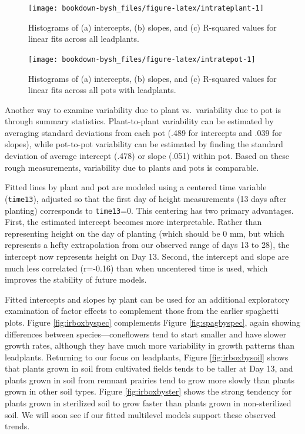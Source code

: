 \documentclass[
]{krantz}
\begin{document}
\begin{figure}

{\centering \texttt{[image: bookdown-bysh\_files/figure-latex/intrateplant-1]} 

}

\caption{ Histograms of (a) intercepts, (b) slopes, and (c) R-squared values for linear fits across all leadplants.}\label{fig:intrateplant}
\end{figure}

\begin{figure}

{\centering \texttt{[image: bookdown-bysh\_files/figure-latex/intratepot-1]} 

}

\caption{Histograms of (a) intercepts, (b) slopes, and (c) R-squared values for linear fits across all pots with leadplants.}\label{fig:intratepot}
\end{figure}

Another way to examine variability due to plant vs.~variability due to pot is through summary statistics. Plant-to-plant variability can be estimated by averaging standard deviations from each pot (.489 for intercepts and .039 for slopes), while pot-to-pot variability can be estimated by finding the standard deviation of average intercept (.478) or slope (.051) within pot. Based on these rough measurements, variability due to plants and pots is comparable.

Fitted lines by plant and pot are modeled using a centered time variable (\texttt{time13}), adjusted so that the first day of height measurements (13 days after planting) corresponds to \texttt{time13}=0. This centering has two primary advantages. First, the estimated intercept becomes more interpretable. Rather than representing height on the day of planting (which should be 0 mm, but which represents a hefty extrapolation from our observed range of days 13 to 28), the intercept now represents height on Day 13. Second, the intercept and slope are much less correlated (r=-0.16) than when uncentered time is used, which improves the stability of future models.

Fitted intercepts and slopes by plant can be used for an additional exploratory examination of factor effects to complement those from the earlier spaghetti plots. Figure \ref{fig:irboxbyspec} complements Figure \ref{fig:spagbyspec}, again showing differences between species---coneflowers tend to start smaller and have slower growth rates, although they have much more variability in growth patterns than leadplants. Returning to our focus on leadplants, Figure \ref{fig:irboxbysoil} shows that plants grown in soil from cultivated fields tends to be taller at Day 13, and plants grown in soil from remnant prairies tend to grow more slowly than plants grown in other soil types. Figure \ref{fig:irboxbyster} shows the strong tendency for plants grown in sterilized soil to grow faster than plants grown in non-sterilized soil. We will soon see if our fitted multilevel models support these observed trends.
\end{document}
